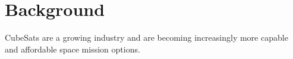 \chapter{Background}\label{CH:background}
CubeSats are a growing industry and are becoming increasingly more capable and affordable space mission options.